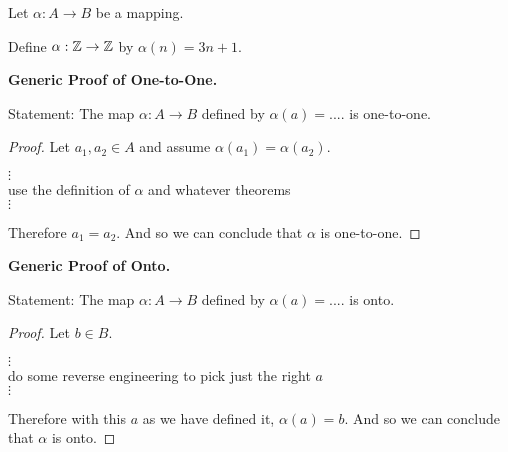 \documentclass[12pt]{article}
\begin{document}
\newpage
{
	\begin{defn}
		Let $\alpha\colon A\to B$ be a mapping.
		
	\end{defn}
	\begin{exercise}
		Define $\alpha:\mathbb{Z}\to\mathbb{Z}$ by $\alpha(n)=3n+1$. 
	\end{exercise}
}
{
	{\textbf{Generic Proof of One-to-One.}}
	
		Statement: The map $\alpha:A\to B$ defined by $\alpha(a)=....$ is one-to-one.
		\begin{proof}
			Let $a_1,a_2\in A$ and assume $\alpha(a_1)=\alpha(a_2)$.
			
			\begin{center}
			$\vdots$\\
			use the definition of $\alpha$ and whatever theorems\\
			$\vdots$
			\end{center}
			
			Therefore $a_1=a_2$.  And so we can conclude that $\alpha$ is one-to-one.
		\end{proof}
		
	
}
{
	{\textbf{Generic Proof of Onto.}}
	
	Statement: The map $\alpha:A\to B$ defined by $\alpha(a)=....$ is onto.
	\begin{proof}
		Let $b\in B$.
		
		\begin{center}
			$\vdots$\\
			do some reverse engineering to pick just the right $a$\\
			$\vdots$
		\end{center}
		
		Therefore with this $a$ as we have defined it, $\alpha(a)=b$.  And so we can conclude that $\alpha$ is onto.
	\end{proof}
		
	
}
\end{document}
